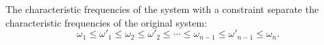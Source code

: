 The characteristic frequencies of the system with a constraint separate the characteristic frequencies of the original system:
$$\omega_1 \leq \omega'_1 \leq \omega_2 \leq \omega'_2 \leq \cdots \leq \omega_{n-1} \leq \omega'_{n-1} \leq \omega_n.$$

